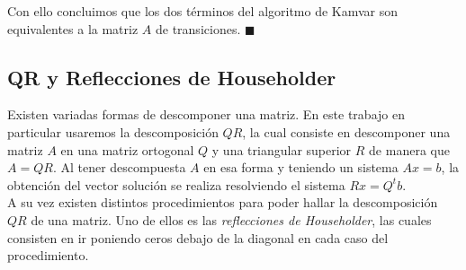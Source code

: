 Con ello concluimos que los dos términos del algoritmo de Kamvar son equivalentes
a la matriz $A$ de transiciones. $ \blacksquare $

\subsection{QR y Reflecciones de Householder}

Existen variadas formas de descomponer una matriz. En este trabajo en particular usaremos la descomposición $QR$,
la cual consiste en descomponer una matriz $A$ en una matriz ortogonal $Q$ y una triangular superior $R$
de manera que $A = QR$. Al tener descompuesta $A$ en esa forma y teniendo un sistema $Ax= b$,
la obtención del vector solución se realiza resolviendo el sistema $Rx = Q^{t}b$.\\

A su vez existen distintos procedimientos para poder hallar la descomposición $QR$ de una matriz.
Uno de ellos es las \textit{reflecciones de Householder}, las cuales consisten en ir
poniendo ceros debajo de la diagonal en cada caso del procedimiento.



